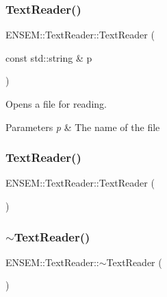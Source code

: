 \subsubsection{\texorpdfstring{TextReader()}{TextReader()}\hspace{0.1cm}{\footnotesize\ttfamily [2/4]}}
{\footnotesize\ttfamily E\+N\+S\+E\+M\+::\+Text\+Reader\+::\+Text\+Reader (\begin{DoxyParamCaption}\item[{const std\+::string \&}]{p }\end{DoxyParamCaption})\hspace{0.3cm}{\ttfamily [explicit]}}

Opens a file for reading. 
\begin{DoxyParams}{Parameters}
{\em p} & The name of the file \\
\hline
\end{DoxyParams}
\mbox{\label{classENSEM_1_1TextReader_a139e8717032f310089148dd58b30d1d2}} 
\subsubsection{\texorpdfstring{TextReader()}{TextReader()}\hspace{0.1cm}{\footnotesize\ttfamily [3/4]}}
{\footnotesize\ttfamily E\+N\+S\+E\+M\+::\+Text\+Reader\+::\+Text\+Reader (\begin{DoxyParamCaption}{ }\end{DoxyParamCaption})}

\mbox{\label{classENSEM_1_1TextReader_a95ed1b116302f6fc2532451bd5df2dbd}} 
\subsubsection{\texorpdfstring{$\sim$TextReader()}{~TextReader()}\hspace{0.1cm}{\footnotesize\ttfamily [2/2]}}
{\footnotesize\ttfamily E\+N\+S\+E\+M\+::\+Text\+Reader\+::$\sim$\+Text\+Reader (\begin{DoxyParamCaption}{ }\end{DoxyParamCaption})}

